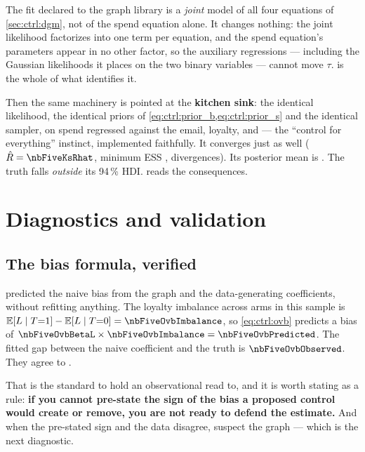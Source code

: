 \begin{remark}
The fit declared to the graph library is a \emph{joint} model of all four equations of
\cref{sec:ctrl:dgm}, not of the spend equation alone. It changes nothing: the joint likelihood
factorizes into one term per equation, and the spend equation's parameters appear in no other
factor, so the auxiliary regressions --- including the Gaussian likelihoods it places on the two
binary variables --- cannot move $\tau$.  is the whole of what identifies it.
\end{remark}

Then the same machinery is pointed at the \textbf{kitchen sink}: the identical likelihood, the
identical priors of \cref{eq:ctrl:prior_b,eq:ctrl:prior_s} and the identical sampler, on spend
regressed against the email, loyalty,  and  --- the ``control
for everything'' instinct, implemented faithfully. It converges just as well
($\hat R = \nbFiveKsRhat$, minimum ESS \nbFiveKsEss, \nbFiveKsDivergences{} divergences). Its
posterior mean is \eur{\nbFiveKsBayesEst}. The truth falls \emph{outside} its 94\,\% HDI.
 reads the consequences.

\section{Diagnostics and validation}
\label{sec:ctrl:valid}

\subsection*{The bias formula, verified}

 predicted the naive bias from the graph and the data-generating
coefficients, without refitting anything. The loyalty imbalance across arms in this sample is
$\E[L \mid T{=}1] - \E[L \mid T{=}0] = \nbFiveOvbImbalance$, so \cref{eq:ctrl:ovb} predicts a bias
of $\nbFiveOvbBetaL \times \nbFiveOvbImbalance = \nbFiveOvbPredicted$. The fitted gap between the
naive coefficient and the truth is $\nbFiveOvbObserved$. They agree to \eur{\nbFiveOvbAgree}.

That is the standard to hold an observational read to, and it is worth stating as a rule:
\textbf{if you cannot pre-state the sign of the bias a proposed control would create or remove,
you are not ready to defend the estimate.} And when the pre-stated sign and the data disagree,
suspect the graph --- which is the next diagnostic.

